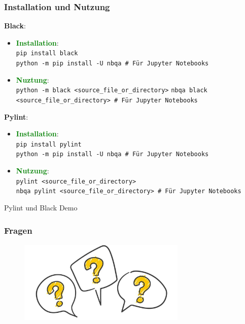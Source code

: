 \documentclass[10pt]{beamer}
\newcommand{\htgreen}[1] {{\bf \textcolor{Green}{#1}}}
\begin{document}
\begin{frame}[fragile]
  \frametitle{Installation und Nutzung}
  {\bf Black}:
  \begin{itemize}
    \item \htgreen{Installation}: \\
      \texttt{pip install black}\\
      \texttt{python -m pip install -U nbqa # Für Jupyter Notebooks}
    \item \htgreen{Nuztung}:\\
      \texttt{python -m black <source_file_or_directory>}
      \texttt{nbqa black <source_file_or_directory> # Für Jupyter Notebooks}
  \end{itemize}
  \vspace{0.5cm}

  {\bf Pylint}:
  \begin{itemize}
    \item \htgreen{Installation}: \\
      \texttt{pip install pylint}  \\
      \texttt{python -m pip install -U nbqa # Für Jupyter Notebooks}
    \item \htgreen{Nutzung}:\\
      \texttt{pylint <source_file_or_directory>}\\
      \texttt{nbqa pylint <source_file_or_directory> # Für Jupyter Notebooks}
  \end{itemize}
\end{frame}

\begin{frame}
    \Huge{\centerline{Pylint und Black Demo}}
\end{frame}


\begin{frame}
  \frametitle{Fragen}
  \begin{figure}
    \centerline{
      \includegraphics[width=8cm, height=4cm]{images/fragen.png}
    }
  \end{figure}
\end{frame}





\end{document}
